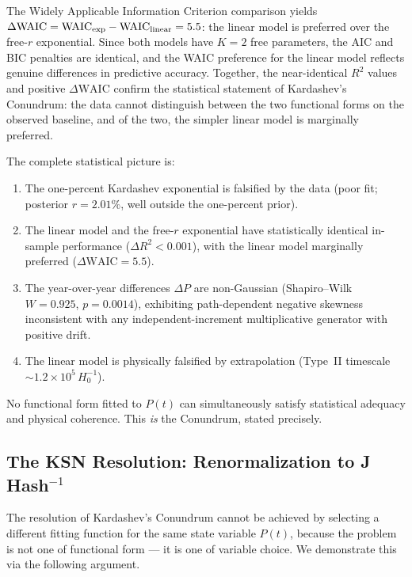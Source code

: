 \documentclass[final,5p,times,twocolumn,authoryear]{elsarticle}
\begin{document}
The Widely Applicable Information Criterion \citep[WAIC;][]{Watanabe2010}
comparison yields $\Delta\mathrm{WAIC} = \mathrm{WAIC}_{\rm exp} -
\mathrm{WAIC}_{\rm linear} = 5.5$: the linear model is preferred over the
free-$r$ exponential. Since both models have $K = 2$ free parameters, the
AIC and BIC penalties are identical, and the WAIC preference for the linear
model reflects genuine differences in predictive accuracy. Together, the
near-identical $R^2$ values and positive $\Delta\mathrm{WAIC}$ confirm the
statistical statement of Kardashev's Conundrum: the data cannot distinguish
between the two functional forms on the observed baseline, and of the two, the
simpler linear model is marginally preferred.
 
The complete statistical picture is:
\begin{enumerate}
    \item The one-percent Kardashev exponential is falsified by the data
          (poor fit; posterior $r = 2.01\%$, well outside the
          one-percent prior).
    \item The linear model and the free-$r$ exponential have
          statistically identical in-sample performance
          ($\Delta R^2 < 0.001$), with the linear model marginally
          preferred ($\Delta\mathrm{WAIC} = 5.5$).
    \item The year-over-year differences $\Delta P$ are non-Gaussian
          (Shapiro--Wilk $W = 0.925$, $p = 0.0014$), exhibiting
          path-dependent negative skewness inconsistent with any
          independent-increment multiplicative generator with
          positive drift.
    \item The linear model is physically falsified by extrapolation
          (Type~II timescale $\sim 1.2 \times 10^5\,H_0^{-1}$).
\end{enumerate}
No functional form fitted to $P(t)$ can simultaneously satisfy statistical
adequacy and physical coherence. This \emph{is} the Conundrum, stated
precisely.
 
\subsection{The KSN Resolution: Renormalization to J\,Hash$^{-1}$}
\label{sec:ksn}
 
The resolution of Kardashev's Conundrum cannot be achieved by selecting
a different fitting function for the same state variable $P(t)$, because the
problem is not one of functional form --- it is one of variable choice.
We demonstrate this via the following argument.
 
\end{document}

